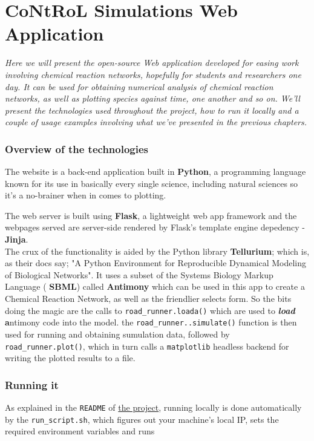 \chapter{CoNtRoL Simulations Web Application}
\label{conclusions}

\par
\textit{ Here we will present the open-source Web application developed for easing work involving chemical reaction networks, hopefully for students and researchers one day. It can be used for obtaining numerical analysis of chemical reaction networks, as well as plotting species against time, one another and so on. We'll present the technologies used throughout the project, how to run it locally and a couple of usage examples involving what we've presented in the previous chapters. }

\subsection{Overview of the technologies}
The website is a back-end application built in \textbf{Python}, a programming language known for its use in basically every single science, including natural sciences so it's a no-brainer when in comes to plotting.

The web server is built using \textbf{Flask}, a lightweight web app framework and the webpages served are server-side rendered by Flask's template engine depedency - \textbf{Jinja}.
\\
The crux of the functionality is aided by the Python library \textbf{Tellurium}; which is, as their docs say; "A Python Environment for Reproducible Dynamical Modeling of Biological Networks". It uses a subset of the Systems Biology Markup Language ( \textbf{SBML}) called \textbf{Antimony} which can be used in this app to create a Chemical Reaction Network, as well as the friendlier selects form. So the bits doing the magic are the calls to \verb|road_runner.loada()| which are used to \textbf{\textit{load}}    \textbf{a}ntimony code into the model.
the \verb|road_runner..simulate()| function is then used for running and obtaining sumulation data, followed by \verb|road_runner.plot()|, which in turn calls a \verb|matplotlib| headless backend for writing the plotted results to a file.

\subsection{Running it}
As explained in the \verb|README| of \href{https://github.com/viktorashi/Open-CoNtRol}{the project}, running locally is done automatically by the \verb|run_script.sh|, which figures out your machine's local IP, sets the required environment variables and runs \\


